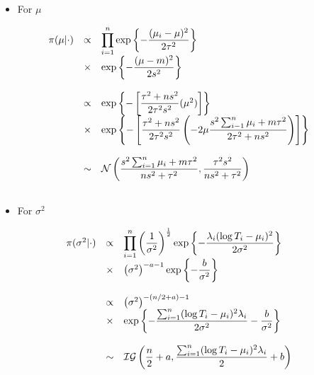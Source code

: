 \documentclass{asaproc}
\begin{document}
\begin{itemize}
\item For $\mu$
\end{itemize}

\begin{small}
\begin{eqnarray*}
\begin{array}{lcl ll }
\pi(\mu|\cdot) & \propto & \displaystyle\prod_{i=1}^{n} \mbox{exp}\left\{ -\dfrac{(\mu_i - \mu)^2}{2\tau^2}\right\}  \\
& \times &\mbox{exp}\left\{ -\dfrac{(\mu - m)^2}{2s^2}\right\} \\ \\
& \propto &  \mbox{exp}\left\{ - \left[ \dfrac{\tau^2 + n s^2}{2\tau^2s^2}(\mu^2) \right] \right\} \\
& \times &  \mbox{exp}\left\{ - \left[ \dfrac{\tau^2 + n s^2}{2\tau^2s^2}\left( -2\mu \dfrac{s^2 \sum_{i-1}^{n}\mu_i + m\tau^2}{2\tau^2 + n s^2} \right) \right] \right\} \\\\
& \sim & \mathcal{N}\left( \dfrac{s^2\sum_{i=1}^{n} \mu_i + m\tau^2}{n s^2 + \tau^2}, \dfrac{\tau^2s^2}{n s^2 + \tau^2 } \right) \\ \\
\end{array}
\end{eqnarray*}
\end{small}


\begin{itemize}
\item For $\sigma^2$
\end{itemize}
\begin{small}
\begin{eqnarray*}
\begin{array}{lcl ll }
\pi(\sigma^2|\cdot) & \propto &\displaystyle\prod_{i=1}^{n}  \left(\dfrac{1}{\sigma^2}\right)^{\frac{1}{2}}\mbox{exp}\left\{ -\dfrac{ \lambda_i(\log T_i - \mu_i)^2}{2\sigma^2} \right\} \\
& \times & \left(\sigma^2\right)^{-a-1} \mbox{exp}\left\{ -\dfrac{b}{\sigma^2}\right\}  \\ \\
 & \propto & \left(\sigma^2\right)^{-(n/2 + a)-1} \\
& \times & \mbox{exp}\left\{ -\dfrac{ \sum_{i=1}^{n}(\log T_i - \mu_i)^2\lambda_i}{2\sigma^2} -\dfrac{b}{\sigma^2}\right\}  \\ \\
& \sim & \mathcal{IG}\left( \dfrac{n}{2}+a,  \dfrac{\sum_{i=1}^{n} (\log T_i - \mu_i)^2 \lambda_i}{2} + b \right) \\ \\
\end{array}
\end{eqnarray*}
\end{small}
\end{document}

